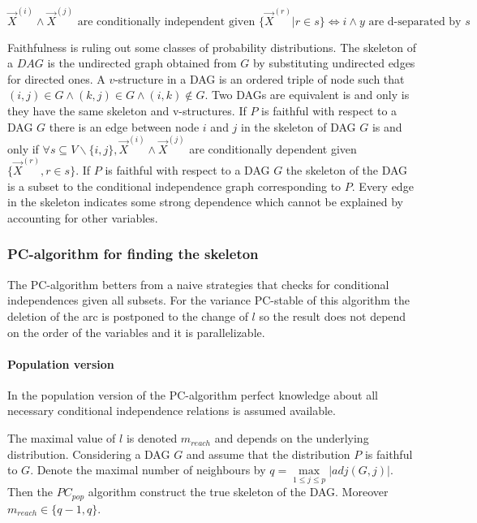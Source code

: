	$$\vec{X}^{(i)}\land \vec{X}^{(j)}\text{ are conditionally independent given } \{\vec{X}^{(r)}|r\in s\}\Leftrightarrow i\land y \text{ are d-separated by } s$$

	Faithfulness is ruling out some classes of probability distributions.
	The skeleton of a $DAG$ is the undirected graph obtained from $G$ by substituting undirected edges for directed ones.
	A $v$-structure in a DAG is an ordered triple of node such that $(i,j)\in G\land (k,j)\in G\land (i,k)\not\in G$.
	Two DAGs are equivalent is and only is they have the same skeleton and v-structures.
	If $P$ is faithful with respect to a DAG $G$ there is an edge between node $i$ and $j$ in the skeleton of DAG $G$ is and only if $\forall s\subseteq V\backslash\{i,j\}, \vec{X}^{(i)}\land \vec{X}^{(j)}$ are conditionally dependent given $\{\vec{X}^{(r)},r\in s\}$.
	If $P$ is faithful with respect to a DAG $G$ the skeleton of the DAG is a subset to the conditional independence graph corresponding to $P$.
	Every edge in the skeleton indicates some strong dependence which cannot be explained by accounting for other variables.

		\subsubsection{PC-algorithm for finding the skeleton}
		The PC-algorithm betters from a naive strategies that checks for conditional independences given all subsets.
		For the variance PC-stable of this algorithm the deletion of the arc is postponed to the change of $l$ so the result does not depend on the order of the variables and it is parallelizable.

			\paragraph{Population version}
			In the population version of the PC-algorithm perfect knowledge about all necessary conditional independence relations is assumed available.

			

			The maximal value of $l$ is denoted $m_{reach}$ and depends on the underlying distribution.
			Considering a DAG $G$ and assume that the distribution $P$ is faithful to $G$.
			Denote the maximal number of neighbours by $q = \max\limits_{1\le j\le p}|adj(G,j)|$.
			Then the $PC_{pop}$ algorithm construct the true skeleton of the DAG.
			Moreover $m_{reach}\in\{q-1,q\}$.

